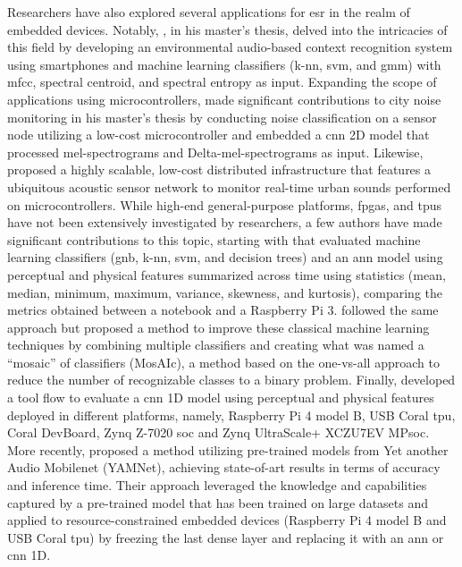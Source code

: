Researchers have also explored several applications for \gls{esr} in the realm of embedded devices. Notably, \textcite{Abreha2014}, in his master's thesis, delved into the intricacies of this field by developing an environmental audio-based context recognition system using smartphones and machine learning classifiers (\gls{k-nn}, \gls{svm}, and \gls{gmm}) with \gls{mfcc}, spectral centroid, and spectral entropy as input. Expanding the scope of applications using microcontrollers, \textcite{Nordby2019} made significant contributions to city noise monitoring in his master’s thesis by conducting noise classification on a sensor node utilizing a low-cost microcontroller and embedded a \gls{cnn} 2D model that processed mel-spectrograms and Delta-mel-spectrograms as input. Likewise, \textcite{VidaaVila2020} proposed a highly scalable, low-cost distributed infrastructure that features a ubiquitous acoustic sensor network to monitor real-time urban sounds performed on microcontrollers. While high-end general-purpose platforms, \gls{fpga}s, and \gls{tpu}s have not been extensively investigated by researchers, a few authors have made significant contributions to this topic, starting with \textcite{Silva2019} that evaluated machine learning classifiers (\gls{gnb}, \gls{k-nn}, \gls{svm}, and decision trees) and an \gls{ann} model using perceptual and physical features summarized across time using statistics (mean, median, minimum, maximum, variance, skewness, and kurtosis), comparing the metrics obtained between a notebook and a Raspberry Pi 3. \textcite{Lhoest2021} followed the same approach but proposed a method to improve these classical machine learning techniques by combining multiple classifiers and creating what was named a “mosaic” of classifiers (MosAIc), a method based on the one-vs-all approach to reduce the number of recognizable classes to a binary problem. Finally, \textcite{Vandendriessche2021} developed a tool flow to evaluate a \gls{cnn} 1D model using perceptual and physical features deployed in different platforms, namely, Raspberry Pi 4 model B, USB Coral \gls{tpu}, Coral DevBoard, Zynq Z-7020 \gls{soc} and Zynq UltraScale+ XCZU7EV MP\gls{soc}. More recently, \textcite{Lamrini2023} proposed a method utilizing pre-trained models from Yet another Audio Mobilenet (YAMNet), achieving state-of-art results in terms of accuracy and inference time. Their approach leveraged the knowledge and capabilities captured by a pre-trained model that has been trained on large datasets and applied to resource-constrained embedded devices (Raspberry Pi 4 model B and USB Coral \gls{tpu}) by freezing the last dense layer and replacing it with an \gls{ann} or \gls{cnn} 1D. 

